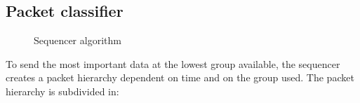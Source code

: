 \documentclass[a4paper]{article}
\begin{document}
    \subsection{Packet classifier}
        \begin{figure}
            \centering
            \caption{Sequencer algorithm}
        \end{figure}
        To send the most important data at the lowest group available, the
        sequencer creates a packet hierarchy dependent on time and on the group
        used. The packet hierarchy is subdivided in:
\end{document}

